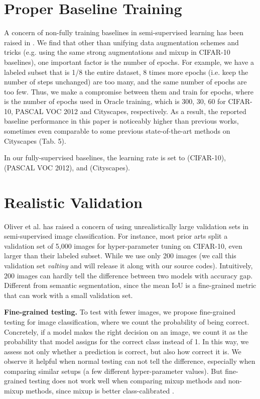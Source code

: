 \documentclass[preprint,review,10pt]{elsarticle}
\begin{document}
\section{Proper Baseline Training}
\label{sec:a3}

A concern of non-fully training baselines in semi-supervised learning has been raised in \cite{oliver2018realistic}. We find that other than unifying data augmentation schemes and tricks (e.g. using the same strong augmentations and mixup in CIFAR-10 baselines), one important factor is the number of epochs. For example, we have a labeled subset that is 1/8 the entire dataset, 8 times more epochs (i.e. keep the number of steps unchanged) are too many, and the same number of epochs are too few. Thus, we make a compromise between them and train for  epochs, where  is the number of epochs used in Oracle training, which is 300, 30, 60 for CIFAR-10, PASCAL VOC 2012 and Cityscapes, respectively. As a result, the reported baseline performance in this paper is noticeably higher than previous works, sometimes even comparable to some previous state-of-the-art methods on Cityscapes (Tab. 5).

In our fully-supervised baselines, the learning rate is set to  (CIFAR-10),  (PASCAL VOC 2012), and  (Cityscapes).

\section{Realistic Validation}
\label{sec:a4}

Oliver et al. \cite{oliver2018realistic} has raised a concern of using unrealistically large validation sets in semi-supervised image classification. For instance, most prior arts split a validation set of 5,000 images for hyper-parameter tuning on CIFAR-10, even larger than their labeled subset. While we use only 200 images (we call this validation set \textit{valtiny} and will release it along with our source codes). Intuitively, 200 images can hardly tell the difference between two models with  accuracy gap. Different from semantic segmentation, since the mean IoU is a fine-grained metric that can work with a small validation set.

\textbf{Fine-grained testing.} To test with fewer images, we propose fine-grained testing for image classification, where we count the probability of being correct. Concretely, if a model makes the right decision on an image, we count it as the probability that model assigns for the correct class instead of 1. In this way, we assess not only whether a prediction is correct, but also how correct it is. We observe it helpful when normal testing can not tell the difference, especially when comparing similar setups (a few different hyper-parameter values). But fine-grained testing does not work well when comparing mixup methods and non-mixup methods, since mixup is better class-calibrated \cite{thulasidasan2019mixup}.
\end{document}
